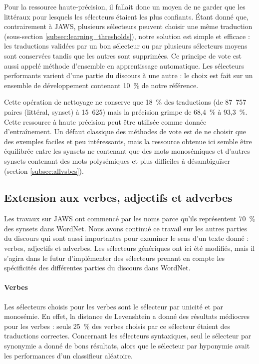 Pour la ressource haute-précision, il fallait donc un moyen de ne garder que
les littéraux pour lesquels les sélecteurs étaient les plus confiants. Étant
donné que, contrairement à JAWS, plusieurs sélecteurs peuvent choisir une même
traduction (sous-section \ref{subsec:learning_thresholds}), notre solution est
simple et efficace : les traductions validées par un bon sélecteur ou par
plusieurs sélecteurs moyens sont conservées tandis que les autres sont
supprimées. Ce principe de vote est aussi appelé méthode d'ensemble en
apprentissage automatique. Les sélecteurs performants varient d'une partie du
discours à une autre : le choix est fait sur un ensemble de développement
contenant 10~\% de notre référence.

Cette opération de nettoyage ne conserve que 18~\% des traductions (de 87~757
paires (littéral, synset) à 15~625) mais la précision grimpe de 68,4~\% à
93,3~\%. Cette ressource à haute précision peut être utilisée comme donnée
d'entraînement. Un défaut classique des méthodes de vote est de ne choisir que
des exemples faciles et peu intéressants, mais la ressource obtenue ici semble
être équilibrée entre les synsets ne contenant que des mots monosémiques et
d'autres synsets contenant des mots polysémiques et plus difficiles à
désambiguïser (section \ref{subsec:allvsbcs}).

\subsection{Extension aux verbes, adjectifs et adverbes}
\label{sec:extending_jaws}

Les travaux sur JAWS ont commencé par les noms parce qu'ils représentent 70~\%
des synsets dans WordNet. Nous avons continué ce travail sur les autres parties
du discours qui sont aussi importantes pour examiner le sens d'un texte donné :
verbes, adjectifs et adverbes. Les sélecteurs génériques ont ici été modifiés,
mais il s'agira dans le futur d'implémenter des sélecteurs prenant en compte
les spécificités des différentes parties du discours dans WordNet.

\paragraph{Verbes} Les sélecteurs choisis pour les verbes sont le sélecteur par
unicité et par monosémie. En effet, la distance de Levenshtein a donné des
résultats médiocres pour les verbes : seuls 25~\% des verbes choisis par ce
sélecteur étaient des traductions correctes. Concernant les sélecteurs
syntaxiques, seul le sélecteur par synonymie a donné de bons résultats, alors
que le sélecteur par hyponymie avait les performances d'un classifieur
aléatoire.

